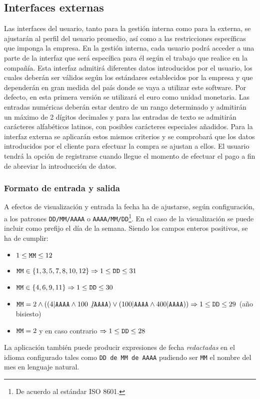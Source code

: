 \documentclass[11pt, a4paper, twoside, titlepage]{article}
\begin{document}
		\subsection{Interfaces externas}
			Las interfaces del usuario, tanto para la gestión interna como para la externa, se ajustarán al perfil del usuario promedio, así como a las restricciones específicas que imponga la empresa. En la gestión interna, cada usuario podrá acceder a una parte de la interfaz que será específica para él según el trabajo que realice en la compañía. Esta interfaz admitirá diferentes datos introducidos por el usuario, los cuales deberán ser válidos según los estándares establecidos por la empresa y que dependerán en gran medida del país donde se vaya a utilizar este software. Por defecto, en esta primera versión se utilizará el euro como unidad monetaria. Las entradas numéricas deberán estar dentro de un rango determinado y admitirán un máximo de 2 dígitos decimales y para las entradas de texto se admitirán carácteres alfabéticos latinos, con posibles carácteres especiales añadidos. Para la interfaz externa se aplicarán estos mismos criterios y se comprobará que los datos introducidos por el cliente para efectuar la compra se ajustan a ellos. El usuario tendrá la opción de registrarse cuando llegue el momento de efectuar el pago a fin de abreviar la introducción de datos.


		\subsubsection{Formato de entrada y salida}

				A efectos de visualización y entrada la fecha ha de ajustarse, según configuración, a los patrones \verb|DD/MM/AAAA| o \verb|AAAA/MM/DD|\footnote{De acuerdo al estándar ISO 8601.}. En el caso de la visualización se puede incluir como prefijo el día de la semana. Siendo los campos enteros positivos, se ha de cumplir:
				\begin{itemize}
					\item $1 \leq \verb|MM| \leq 12$
					\item $\verb|MM| \in \{1, 3, 5, 7, 8, 10, 12\} \Rightarrow 1 \leq \verb|DD| \leq 31$
					\item $\verb|MM| \in \{4, 6, 9, 11\} \Rightarrow 1 \leq \verb|DD| \leq 30$ 
					\item $\verb|MM| = 2 \wedge ((4 | \verb|AAAA| \wedge 100 \not| \verb|AAAA|) \vee (100 | \verb|AAAA| \wedge 400 | \verb|AAAA|)) \Rightarrow 1 \leq \verb|DD| \leq 29$ (año bisiesto)
					\item $\verb|MM| = 2$ y en caso contrario $\Rightarrow 1 \leq \verb|DD| \leq 28$
				\end{itemize}
			La aplicación también puede producir expresiones de fecha \textit{redactadas} en el idioma configurado tales como \verb|DD de MM de AAAA| pudiendo ser \verb|MM| el nombre del mes en lenguaje natural.\\
\end{document}
